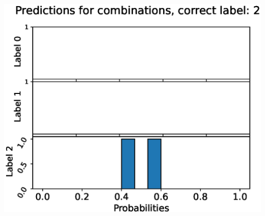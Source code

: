 \begin{center}
\begin{minipage}{0.33\textwidth}
  \includegraphics[width=\textwidth]{files/figs/app/hists/kmfp/pc2.eps}
\end{minipage}
\end{center}
